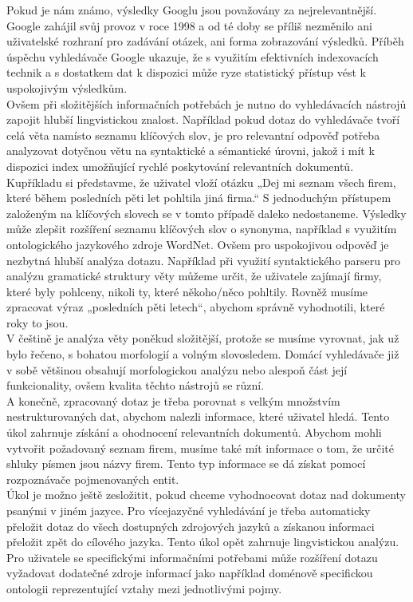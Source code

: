 \documentclass[]{../../metanetpaper}
\begin{document}
\begin{multicols}{2}
Pokud je nám známo, výsledky Googlu jsou považovány za nejrelevantnější. Google zahájil svůj provoz v roce 1998 a od té doby se příliš nezměnilo ani uživatelské rozhraní pro zadávání otázek, ani forma zobrazování výsledků. Příběh úspěchu vyhledávače Google ukazuje, že s využitím efektivních indexovacích technik a s dostatkem dat k dispozici může ryze statistický přístup vést k uspokojivým výsledkům.\\
Ovšem při složitějších informačních potřebách je nutno do vyhledávacích nástrojů zapojit hlubší lingvistickou znalost. Například pokud dotaz do vyhledávače tvoří celá věta namísto seznamu klíčových slov, je pro relevantní odpověď potřeba analyzovat dotyčnou větu na syntaktické a sémantické úrovni, jakož i mít k dispozici index umožňující rychlé poskytování relevantních dokumentů.
Kupříkladu si představme, že uživatel vloží otázku „Dej mi seznam všech firem, které během posledních pěti let pohltila jiná firma.“ S jednoduchým přístupem založeným na klíčových slovech se v tomto případě daleko nedostaneme. Výsledky může zlepšit rozšíření seznamu klíčových slov o synonyma, například s využitím ontologického jazykového zdroje WordNet. Ovšem pro uspokojivou odpověď je nezbytná hlubší analýza dotazu. Například při využití syntaktického parseru pro analýzu gramatické struktury věty můžeme určit, že uživatele zajímají firmy, které byly pohlceny, nikoli ty, které někoho/něco pohltily. Rovněž musíme zpracovat výraz „posledních pěti letech“, abychom správně vyhodnotili, které roky to jsou.\\
V češtině je analýza věty poněkud složitější, protože se musíme vyrovnat, jak už bylo řečeno, s bohatou morfologií a volným slovosledem. Domácí vyhledávače již v sobě většinou obsahují morfologickou analýzu nebo alespoň část její funkcionality, ovšem kvalita těchto nástrojů se různí.\\
A konečně, zpracovaný dotaz je třeba porovnat s velkým množstvím nestrukturovaných dat, abychom nalezli informace, které uživatel hledá. Tento úkol zahrnuje získání a ohodnocení relevantních dokumentů. Abychom mohli vytvořit požadovaný seznam firem, musíme také mít informace o tom, že určité shluky písmen jsou názvy firem. Tento typ informace se dá získat pomocí rozpoznávače pojmenovaných entit.\\
Úkol je možno ještě zesložitit, pokud chceme vyhodnocovat dotaz nad dokumenty psanými v jiném jazyce. Pro vícejazyčné vyhledávání je třeba automaticky přeložit dotaz do všech dostupných zdrojových jazyků a získanou informaci přeložit zpět do cílového jazyka. Tento úkol opět zahrnuje lingvistickou analýzu. Pro uživatele se specifickými informačními potřebami může rozšíření dotazu vyžadovat dodatečné zdroje informací jako například doménově specifickou ontologii reprezentující vztahy mezi jednotlivými pojmy.


\end{multicols}
\end{document}
